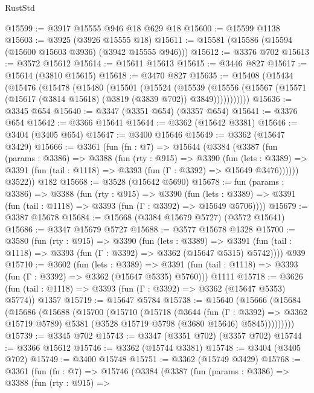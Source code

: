 \begin{lexlean}{RustStd}
\begin{coremodule}
@15599 := @3917 @15555 @946 @18 @629 @18
@15600 := @15599 @1138
@15603 := @3925 (@3926 @15555 @18)
@15611 := @15581 (@15586 (@15594 (@15600 @15603 @3936) (@3942 @15555 @946)))
@15612 := @3376 @702
@15613 := @3572 @15612
@15614 := @15611 @15613
@15615 := @3446 @827
@15617 := @15614 (@3810 @15615)
@15618 := @3470 @827
@15635 := @15408
    (@15434
      (@15476
        (@15478
          (@15480
            (@15501
              (@15524
                (@15539
                  (@15556
                    (@15567 (@15571 (@15617 (@3814 @15618) (@3819 (@3839 @702)) @3849)))))))))))
@15636 := @3345 @654
@15640 := @3347 (@3351 @654) (@3357 @654)
@15641 := @3376 @654
@15642 := @3366 @15641
@15644 := @3362 (@15642 @3381)
@15646 := @3404 (@3405 @654)
@15647 := @3400 @15646
@15649 := @3362 (@15647 @3429)
@15666 := @3361
    (fun (fn : @7) =>
    @15644
      (@3384
        (@3387
          (fun (params : @3386) =>
          @3388
            (fun (rty : @915) =>
            @3390
              (fun (lets : @3389) =>
              @3391 (fun (tail : @1118) => @3393 (fun (Γ : @3392) => @15649 @3476))))))
        @3522))
    @182
@15668 := @3528 (@15642 @5690)
@15678 := fun (params : @3386) =>
  @3388
    (fun (rty : @915) =>
    @3390
      (fun (lets : @3389) => @3391 (fun (tail : @1118) => @3393 (fun (Γ : @3392) => @15649 @5706))))
@15679 := @3387 @15678
@15684 := @15668 (@3384 @15679 @5727) (@3572 @15641)
@15686 := @3347 @15679 @5727
@15688 := @3577 @15678 @1328
@15700 := @3580
    (fun (rty : @915) =>
    @3390
      (fun (lets : @3389) =>
      @3391 (fun (tail : @1118) => @3393 (fun (Γ : @3392) => @3362 (@15647 @5315) @5742))))
    @939
@15710 := @3602
    (fun (lets : @3389) =>
    @3391 (fun (tail : @1118) => @3393 (fun (Γ : @3392) => @3362 (@15647 @5335) @5760)))
    @1111
@15718 := @3626 (fun (tail : @1118) => @3393 (fun (Γ : @3392) => @3362 (@15647 @5353) @5774)) @1357
@15719 := @15647 @5784
@15738 := @15640
    (@15666
      (@15684
        (@15686
          (@15688
            (@15700
              (@15710
                (@15718
                  (@3644
                    (fun (Γ : @3392) => @3362 @15719 @5789)
                    @5381
                    (@3528 @15719 @5798 (@3680 @15646) @5845)))))))))
@15739 := @3345 @702
@15743 := @3347 (@3351 @702) (@3357 @702)
@15744 := @3366 @15612
@15746 := @3362 (@15744 @3381)
@15748 := @3404 (@3405 @702)
@15749 := @3400 @15748
@15751 := @3362 (@15749 @3429)
@15768 := @3361
    (fun (fn : @7) =>
    @15746
      (@3384
        (@3387
          (fun (params : @3386) =>
          @3388
            (fun (rty : @915) =>

\end{coremodule}
\end{lexlean}
